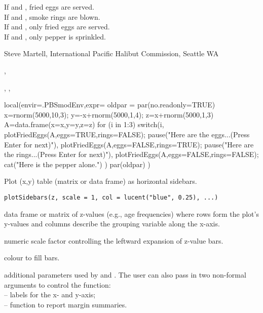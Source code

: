 \documentclass[letterpaper]{book}
\begin{document}
%
\begin{Note}\relax
If  and , fried eggs are served.\\{}
If  and , smoke rings are blown.\\{}
If  and , only fried eggs are served.\\{}
If  and , only pepper is sprinkled.
\end{Note}
%
\begin{Author}\relax
Steve Martell, International Pacific Halibut Commission, Seattle WA
\end{Author}
%
\begin{SeeAlso}\relax
{}, 

, , 
\end{SeeAlso}
%
\begin{Examples}
\begin{ExampleCode}
local(envir=.PBSmodEnv,expr={
  oldpar = par(no.readonly=TRUE)
  x=rnorm(5000,10,3); y=-x+rnorm(5000,1,4); z=x+rnorm(5000,1,3)
  A=data.frame(x=x,y=y,z=z)
  for (i in 1:3)
    switch(i,
    {plotFriedEggs(A,eggs=TRUE,rings=FALSE);
     pause("Here are the eggs...(Press Enter for next)")},
    {plotFriedEggs(A,eggs=FALSE,rings=TRUE);
     pause("Here are the rings...(Press Enter for next)")},
    {plotFriedEggs(A,eggs=FALSE,rings=FALSE);
     cat("Here is the pepper alone.\n")} )
  par(oldpar)
})
\end{ExampleCode}
\end{Examples}
%
\begin{Description}\relax
Plot (x,y) table (matrix or data frame) as horizontal sidebars.
\end{Description}
%
\begin{Usage}
\begin{verbatim}
plotSidebars(z, scale = 1, col = lucent("blue", 0.25), ...)
\end{verbatim}
\end{Usage}
%
\begin{Arguments}
\begin{ldescription}
\item[\code{z}] data frame or matrix of z-values (e.g., age frequencies) where 
rows form the plot's y-values and columns describe the grouping 
variable along the x-axis.
\item[\code{scale}] numeric scale factor controlling the leftward expansion of z-value bars.
\item[\code{col}] colour to fill bars.
\item[\code{...}] additional parameters used by  and . 
The user can also pass in two non-formal arguments to control the function: \\{}
 -- labels for the x- and y-axis; \\{}
 -- function to report margin summaries. 
\end{ldescription}
\end{Arguments}
\end{document}
